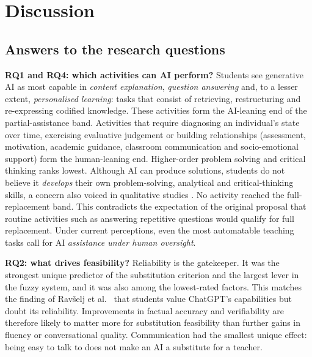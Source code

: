 \documentclass[fleqn,10pt]{wlscirep}
\theoremstyle{remark}
\begin{document}


\section{Discussion}
\label{sec:discussion}

\subsection{Answers to the research questions}
\textbf{RQ1 and RQ4: which activities can AI perform?} Students see generative AI as most capable in \emph{content explanation}, \emph{question answering} and, to a lesser extent, \emph{personalised learning}: tasks that consist of retrieving, restructuring and re-expressing codified knowledge. These activities form the AI-leaning end of the partial-assistance band. Activities that require diagnosing an individual's state over time, exercising evaluative judgement or building relationships (assessment, motivation, academic guidance, classroom communication and socio-emotional support) form the human-leaning end. Higher-order problem solving and critical thinking ranks lowest. Although AI can produce solutions, students do not believe it \emph{develops} their own problem-solving, analytical and critical-thinking skills, a concern also voiced in qualitative studies \cite{chantsi2024,chanhu2023}. No activity reached the full-replacement band. This contradicts the expectation of the original proposal that routine activities such as answering repetitive questions would qualify for full replacement. Under current perceptions, even the most automatable teaching tasks call for AI \emph{assistance under human oversight}.

\textbf{RQ2: what drives feasibility?} Reliability is the gatekeeper. It was the strongest unique predictor of the substitution criterion and the largest lever in the fuzzy system, and it was also among the lowest-rated factors. This matches the finding of Ravšelj et al.~\cite{ravselj2025} that students value ChatGPT's capabilities but doubt its reliability. Improvements in factual accuracy and verifiability are therefore likely to matter more for substitution feasibility than further gains in fluency or conversational quality. Communication had the smallest unique effect: being easy to talk to does not make an AI a substitute for a teacher.
\end{document}
